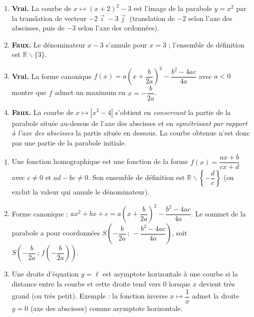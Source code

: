 \documentclass[11pt]{article}
\newcommand{\cle}[1]{{\popxbold\color{popdark}#1}}
\def\setminus{\mathbin{\backslash}}\let\smallsetminus\setminus
\begin{document}
\begin{corrige}
\begin{enumerate}
\item \textbf{Vrai.} La courbe de $x\mapsto (x+2)^2-3$ est l'image de la parabole $y=x^2$ par la translation de vecteur $-2\vec{\imath}-3\vec{\jmath}$ (translation de $-2$ selon l'axe des abscisses, puis de $-3$ selon l'axe des ordonnées).
\item \textbf{Faux.} Le dénominateur $x-3$ s'annule pour $x=3$ ; l'ensemble de définition est $\mathbb{R}\setminus\{3\}$.
\item \textbf{Vrai.} La forme canonique $f(x)=a\left(x+\dfrac{b}{2a}\right)^2-\dfrac{b^2-4ac}{4a}$ avec $a<0$ montre que $f$ admet un \cle{maximum} en $x=-\dfrac{b}{2a}$.
\item \textbf{Faux.} La courbe de $x\mapsto|x^2-4|$ s'obtient en \emph{conservant} la partie de la parabole située au-dessus de l'axe des abscisses et en \emph{symétrisant par rapport à l'axe des abscisses} la partie située en dessous. La courbe obtenue n'est donc pas une partie de la parabole initiale.
\end{enumerate}
\end{corrige}

\begin{corrige}
\begin{enumerate}
\item Une \cle{fonction homographique} est une fonction de la forme $f(x)=\dfrac{ax+b}{cx+d}$ avec $c\neq 0$ et $ad-bc\neq 0$. Son ensemble de définition est $\mathbb{R}\setminus\left\{-\dfrac{d}{c}\right\}$ (on exclut la valeur qui annule le dénominateur).
\item Forme canonique : $ax^2+bx+c=a\left(x+\dfrac{b}{2a}\right)^2-\dfrac{b^2-4ac}{4a}$. Le sommet de la parabole a pour coordonnées $S\left(-\dfrac{b}{2a}\,;\,-\dfrac{b^2-4ac}{4a}\right)$, soit $S\left(-\dfrac{b}{2a}\,;\,f\left(-\dfrac{b}{2a}\right)\right)$.
\item Une droite d'équation $y=\ell$ est \cle{asymptote horizontale} à une courbe si la distance entre la courbe et cette droite tend vers $0$ lorsque $x$ devient très grand (ou très petit). Exemple : la fonction inverse $x\mapsto\dfrac{1}{x}$ admet la droite $y=0$ (axe des abscisses) comme asymptote horizontale.
\end{enumerate}
\end{corrige}
\end{document}
